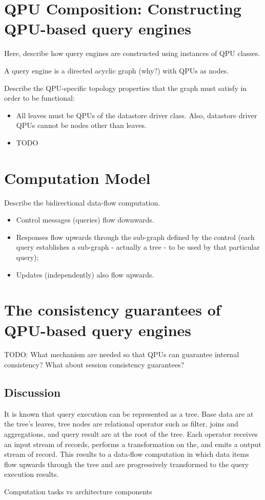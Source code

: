 \section{QPU Composition: Constructing QPU-based query engines}
Here, describe how query engines are constructed using instances of QPU classes.

A query engine is a directed acyclic graph (why?) with QPUs as nodes.

Describe the QPU-specific topology properties that the graph must satisfy in
order to be functional:
\begin{itemize}
  \item All leaves must be QPUs of the datastore driver class.
  Also, datastore driver QPUs cannot be nodes other than leaves.
  \item TODO
\end{itemize}

\section{Computation Model}
Describe the bidirectional data-flow computation.
\begin{itemize}
  \item Control messages (queries) flow downwards.
  \item Responses flow upwards through the sub-graph defined by the control
  (each query establishes a sub-graph - actually a tree - to be used by that
  particular query);
  \item Updates (independently) also flow upwards.
\end{itemize}


\section{The consistency guarantees of QPU-based query engines}
TODO: What mechanism are needed so that QPUs can guarantee internal consistency?
What about session consistency guarantees?

\subsection{Discussion}
It is known that query execution can be represented as a tree.
Base data are at the tree's leaves, tree nodes are relational operator such
as filter, joins and aggregations, and query result are at the root of the tree.
Each operator receives an input stream of records, performs a transformation on the, and emits a output stream of record.
This results to a data-flow computation in which data items flow upwards through the tree and are progressively transformed
to the query execution results.

Computation tasks vs architecture components
